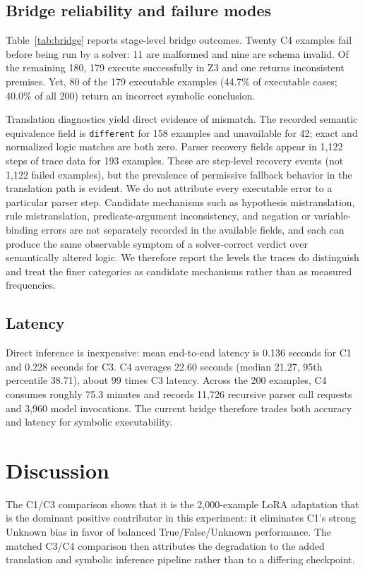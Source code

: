 \documentclass[conference]{IEEEtran}
\begin{document}
\subsection{Bridge reliability and failure modes}
Table~\ref{tab:bridge} reports stage-level bridge outcomes. Twenty C4 examples fail before being run by a solver: 11 are malformed and nine are schema invalid. Of the remaining 180, 179 execute successfully in Z3 and one returns inconsistent premises. Yet, 80 of the 179 executable examples (44.7\% of executable cases; 40.0\% of all 200) return an incorrect symbolic conclusion.

Translation diagnostics yield direct evidence of mismatch. The recorded semantic equivalence field is \texttt{different} for 158 examples and unavailable for 42; exact and normalized logic matches are both zero. Parser recovery fields appear in 1,122 steps of trace data for 193 examples. These are step-level recovery events (not 1,122 failed examples), but the prevalence of permissive fallback behavior in the translation path is evident. We do not attribute every executable error to a particular parser step. Candidate mechanisms such as hypothesis mistranslation, rule mistranslation, predicate-argument inconsistency, and negation or variable-binding errors are not separately recorded in the available fields, and each can produce the same observable symptom of a solver-correct verdict over semantically altered logic. We therefore report the levels the traces do distinguish and treat the finer categories as candidate mechanisms rather than as measured frequencies.



\subsection{Latency}
Direct inference is inexpensive: mean end-to-end latency is 0.136 seconds for C1 and 0.228 seconds for C3. C4 averages 22.60 seconds (median 21.27, 95th percentile 38.71), about 99 times C3 latency. Across the 200 examples, C4 consumes roughly 75.3 minutes and records 11,726 recursive parser call requests and 3,960 model invocations. The current bridge therefore trades both accuracy and latency for symbolic executability.

\section{Discussion}
The C1/C3 comparison shows that it is the 2,000-example LoRA adaptation that is the dominant positive contributor in this experiment: it eliminates C1's strong Unknown bias in favor of balanced True/False/Unknown performance. The matched C3/C4 comparison then attributes the degradation to the added translation and symbolic inference pipeline rather than to a differing checkpoint.
\end{document}
